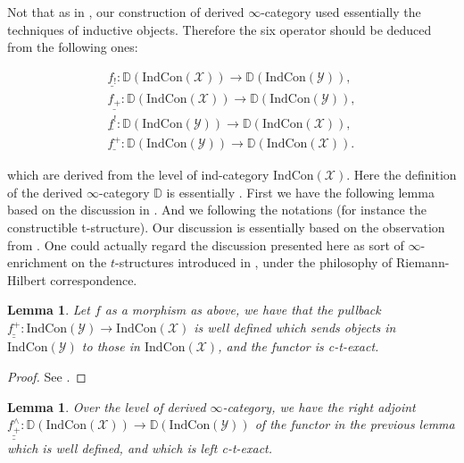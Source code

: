 \documentclass[11pt]{book}
\newtheorem{lemma}[theorem]{Lemma}
\theoremstyle{definition}
\numberwithin{equation}{section}
\begin{document}
\indent Not that as in \cite[Section 1.2]{Abe1}, our construction of derived $\infty$-category used essentially the techniques of inductive objects. Therefore the six operator should be deduced from the following ones:

\begin{align}
\underline{f_!}: \mathbb{D}(\mathrm{Ind}\mathrm{Con}(\mathcal{X}))\rightarrow \mathbb{D}(\mathrm{Ind}\mathrm{Con}(\mathcal{Y})),\\
\underline{f_+}: \mathbb{D}(\mathrm{Ind}\mathrm{Con}(\mathcal{X}))\rightarrow \mathbb{D}(\mathrm{Ind}\mathrm{Con}(\mathcal{Y})),\\
\underline{f^!}: \mathbb{D}(\mathrm{Ind}\mathrm{Con}(\mathcal{Y}))\rightarrow \mathbb{D}(\mathrm{Ind}\mathrm{Con}(\mathcal{X})),\\
\underline{f^+}: \mathbb{D}(\mathrm{Ind}\mathrm{Con}(\mathcal{Y}))\rightarrow \mathbb{D}(\mathrm{Ind}\mathrm{Con}(\mathcal{X})).
\end{align}
 
which are derived from the level of ind-category $\mathrm{Ind}\mathrm{Con}(\mathcal{X})$. Here the definition of the derived $\infty$-category $\mathbb{D}$ is essentially \cite[Section 1.3.5]{Lurie2}. First we have the following lemma based on the discussion in \cite{Abe1}. And we following the notations (for instance the constructible t-structure). Our discussion is essentially based on the observation from \cite[Section 1.2]{Abe1}. One could actually regard the discussion presented here as sort of $\infty$-enrichment on the $t$-structures introduced in \cite{Abe1}, under the philosophy of Riemann-Hilbert correspondence.




\begin{lemma}
Let $f$ as a morphism as above, we have that the pullback $\underline{\underline{f^+}}: \mathrm{Ind}\mathrm{Con}(\mathcal{Y})\rightarrow \mathrm{Ind}\mathrm{Con}(\mathcal{X})$ is well defined which sends objects in $\mathrm{Ind}\mathrm{Con}(\mathcal{Y})$ to those in $\mathrm{Ind}\mathrm{Con}(\mathcal{X})$, and the functor is c-t-exact. 
\end{lemma}





\begin{proof}
See \cite[Section 1.3]{Abe1}.
\end{proof}



\begin{lemma}
Over the level of derived $\infty$-category, we have the right adjoint $\underline{\underline{f^\wedge_{+}}}: \mathbb{D}(\mathrm{Ind}\mathrm{Con}(\mathcal{X}))\rightarrow \mathbb{D}(\mathrm{Ind}\mathrm{Con}(\mathcal{Y}))$ of the functor in the previous lemma which is well defined, and which is left c-t-exact.	
\end{lemma}
\end{document}
